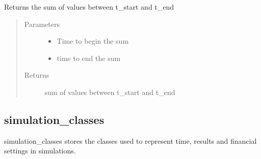 \documentclass[letterpaper,10pt,english]{sphinxmanual}
\begin{document}
\begin{fulllineitems}

\begin{fulllineitems}
\label{\detokenize{index:feast.EmissionSimModules.result_classes.ResultDiscrete.get_sum_val}}
Returns the sum of values between t\_start and t\_end
\begin{quote}\begin{description}
\item[{Parameters}] \leavevmode\begin{itemize}
\item {} 
 \textendash{} Time to begin the sum

\item {} 
 \textendash{} time to end the sum

\end{itemize}

\item[{Returns}] \leavevmode
sum of values between t\_start and t\_end

\end{description}\end{quote}

\end{fulllineitems}


\end{fulllineitems}



\subsection{simulation\_classes}
\label{\detokenize{index:module-feast.EmissionSimModules.simulation_classes}}\label{\detokenize{index:simulation-classes}}
simulation\_classes stores the classes used to represent time, results and financial settings in simulations.
\end{document}
